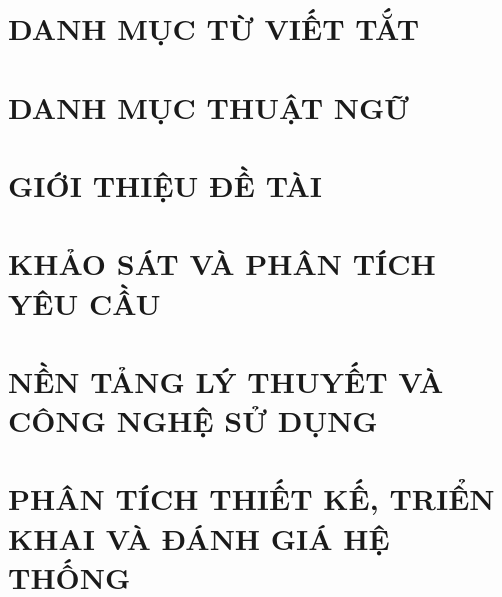 \documentclass[a4paper,13pt,3p,twoside]{report}
\theoremstyle{definition}
\begin{document}

\newpage
\chapter*{DANH MỤC TỪ VIẾT TẮT}


\newpage
\chapter*{DANH MỤC THUẬT NGỮ}



\newpage
{}

\pagestyle{fancy}
\fancyhf{}
\fancyhead[RE, LO]{\leftmark}
\fancyfoot[RE, LO]{\thepage}

\chapter{GIỚI THIỆU ĐỀ TÀI}
\label{chapter:Introduction}

\newpage
\chapter{KHẢO SÁT VÀ PHÂN TÍCH YÊU CẦU}
\label{chapter:Related_works}



\newpage
\chapter{NỀN TẢNG LÝ THUYẾT VÀ CÔNG NGHỆ SỬ DỤNG}
\label{chapter:Methodology}


\newpage
\chapter{PHÂN TÍCH THIẾT KẾ, TRIỂN KHAI VÀ ĐÁNH GIÁ HỆ THỐNG}
\label{chapter:Experiment}

\end{document}
